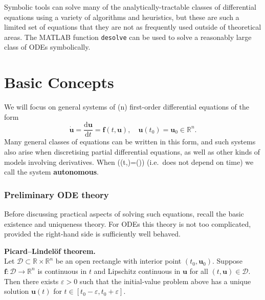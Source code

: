 \documentclass[
  letterpaper,
  DIV=11,
  numbers=noendperiod]{scrreprt}
\newenvironment{fbxSimple}[3]{\begin{tcolorbox}[enhanced, breakable,%
attach boxed title to top*={xshift=1.4pt},
boxed title style={boxrule=0.0mm, fuzzy shadow={1pt}{-1pt}{0mm}{0.1mm}{gray}, arc=.3em, rounded corners=east, sharp corners=west}, colframe=#1-color2, colbacktitle=#1-color1, colback = white, coltitle=black,  titlerule=0mm, toprule=0pt, bottomrule=.7pt, leftrule=.3em, rightrule=.7pt, outer arc=.3em,  	left=.5em, right=.5em, bottomtitle=1mm, toptitle=1mm,title=\textbf{#2}\hspace{0.5em}{#3}]}
{\end{tcolorbox}}
\begin{document}
\begin{tcolorbox}[enhanced jigsaw, opacityback=0, breakable, title=\textcolor{quarto-callout-note-color}{\faInfo}\hspace{0.5em}{Note}, arc=.35mm, coltitle=black, opacitybacktitle=0.6, bottomrule=.15mm, leftrule=.75mm, left=2mm, colbacktitle=quarto-callout-note-color!10!white, titlerule=0mm, toptitle=1mm, bottomtitle=1mm, colframe=quarto-callout-note-color-frame, rightrule=.15mm, colback=white, toprule=.15mm]

Symbolic tools can solve many of the analytically-tractable classes of
differential equations using a variety of algorithms and heuristics, but
these are such a limited set of equations that they are not as
frequently used outside of theoretical areas. The MATLAB function
\texttt{desolve} can be used to solve a reasonably large class of ODEs
symbolically.

\end{tcolorbox}

\section{Basic Concepts}\label{basic-concepts}

We will focus on general systems of (n) first-order differential
equations of the form \[
\dot{\mathbf{u}} = \frac{\mathrm{d}\mathbf{u}}{\mathrm{d}t} = \mathbf{f}(t,\mathbf{u}), \quad \mathbf{u}(t_0)=\mathbf{u}_0 \in \mathbb{R}^n.
\] Many general classes of equations can be written in this form, and
such systems also arise when discretising partial differential
equations, as well as other kinds of models involving derivatives. When
((t,)=()) (i.e.~does not depend
on time) we call the system \textbf{autonomous}.

\subsubsection{Preliminary ODE theory}\label{preliminary-ode-theory}

Before discussing practical aspects of solving such equations, recall
the basic existence and uniqueness theory. For ODEs this theory is not
too complicated, provided the right-hand side is sufficiently well
behaved.

\label{theorem-5.1}
\begin{fbxSimple}{theorem}{Theorem 5.1}{}
\label{theorem-5.1}
\textbf{Picard--Lindelöf theorem.}\\
Let \(\mathcal{D}\subset\mathbb{R}\times\mathbb{R}^n\) be an open
rectangle with interior point \((t_0,\mathbf{u}_0)\). Suppose
\(\mathbf{f}:\mathcal{D}\to\mathbb{R}^n\) is continuous in \(t\) and
Lipschitz continuous in \(\mathbf{u}\) for all
\((t,\mathbf{u})\in\mathcal{D}\). Then there exists \(\varepsilon>0\)
such that the initial-value problem above has a unique solution
\(\mathbf{u}(t)\) for \(t\in[t_0-\varepsilon,t_0+\varepsilon]\).

\end{fbxSimple}
\end{document}
